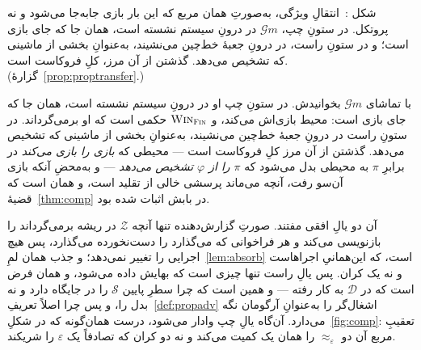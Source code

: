 \documentclass[10pt,oneside,openany]{book}
\newcounter{diagram}
\newcommand{\figcaption}[2]{%
  \par\smallskip
  \refstepcounter{diagram}\label{#1}%
  \parbox{0.92\textwidth}{\footnotesize
    \textcolor{accent}{شکل \thediagram:}\ #2\par}}
\newcommand{\Zenv}{\mathcal{Z}}
\newcommand{\Dum}{\mathcal{D}}
\newcommand{\Sim}{\mathcal{S}}
\newcommand{\op}[1]{\textnormal{\textsc{#1}}}
\newcommand{\Gm}{\mathcal{G}m}
\newcommand{\Win}{\op{Win}}
\theoremstyle{accentdef}
\theoremstyle{accentplain}
\begin{document}
\begin{center}
\figcaption{fig:proptransfer}{انتقالِ ویژگی، به‌صورتِ همان مربع که این بار بازی جابه‌جا می‌شود و نه پروتکل. در ستونِ چپ، $\Gm$ در درونِ سیستم نشسته است، همان جا که جای بازی است؛ و در ستونِ راست، در درونِ جعبهٔ خط‌چین می‌نشیند، به‌عنوانِ بخشی از ماشینی که تشخیص می‌دهد. گذشتن از آن مرز، کلِ فروکاست است. (گزارهٔ~\ref{prop:proptransfer}.)}
\end{center}

با تماشای $\Gm$ بخوانیدش. در ستونِ چپ او در درونِ سیستم نشسته است، همان جا
که جای بازی است: محیط بازی‌اش می‌کند، و $\Win_{\op{Fin}}$ حکمی است که او
برمی‌گرداند. در ستونِ راست در درونِ جعبهٔ خط‌چین می‌نشیند، به‌عنوانِ بخشی از
ماشینی که تشخیص می‌دهد. گذشتن از آن مرز کلِ فروکاست است --- محیطی که
\emph{بازی را بازی می‌کند} در برابرِ $\pi$ به محیطی بدل می‌شود که
\emph{$\pi$ را از $\varphi$ تشخیص می‌دهد} --- و به‌محضِ آنکه بازی آن‌سو
رفت، آنچه می‌ماند پرسشی خالی از تقلید است، و همان است که
قضیهٔ~\ref{thm:comp} در بابش اثبات شده بود.

آن دو یالِ افقی مفتند. صورتِ گزارش‌دهنده تنها آنچه $\Zenv$ در ریشه
برمی‌گرداند را بازنویسی می‌کند و هر فراخوانی که می‌گذارد را دست‌نخورده
می‌گذارد، پس هیچ اجرایی را تغییر نمی‌دهد؛ و جذب همان لمِ~\ref{lem:absorb}
است، که این‌همانیِ اجراهاست و نه یک کران. پس یالِ راست تنها چیزی است که
بهایش داده می‌شود، و همان فرض است که در $\Dum$ به کار رفته --- و همین است
که چرا سطرِ پایین $\Sim$ را در جایگاه دارد و نه بدل را، و پس چرا اصلاً
تعریفِ~\ref{def:propadv} اشغال‌گر را به‌عنوانِ آرگومان نگه می‌دارد. آن‌گاه
یالِ چپ وادار می‌شود، درست همان‌گونه که در شکلِ~\ref{fig:comp}: تعقیبِ مربع
آن دو $\approx_\varepsilon$ را همان یک کمیت می‌کند و نه دو کران که تصادفاً
یک $\varepsilon$ را شریکند.
\end{document}
